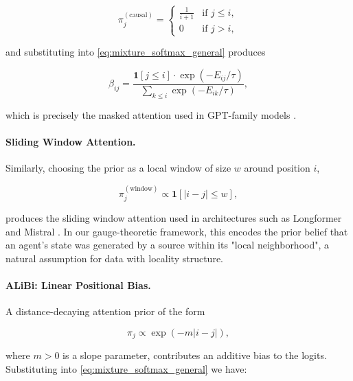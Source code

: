 \documentclass[twoside,11pt]{article}
\begin{document}
\begin{equation}
\pi_j^{(\text{causal})} = \begin{cases} \frac{1}{i+1} & \text{if } j \leq i, \\ 0 & \text{if } j > i, \end{cases}
\label{eq:causal_prior}
\end{equation}

and substituting into \eqref{eq:mixture_softmax_general} produces

\begin{equation}
\beta_{ij} = \frac{\mathbf{1}[j \leq i] \cdot \exp(-E_{ij}/\tau)}{\sum_{k \leq i} \exp(-E_{ik}/\tau)},
\label{eq:causal_attention}
\end{equation}

which is precisely the masked attention used in GPT-family models \citep{radford2019language}. 

\paragraph{Sliding Window Attention.}
Similarly, choosing the prior as a local window of size $w$ around position $i$,

\begin{equation}
\pi_j^{(\text{window})} \propto \mathbf{1}[|i - j| \leq w],
\label{eq:window_prior}
\end{equation}

produces the sliding window attention used in architectures such as Longformer \citep{beltagy2020longformer} and Mistral \citep{jiang2023mistral}. In our gauge-theoretic framework, this encodes the prior belief that an agent's state was generated by a source within its "local neighborhood", a natural assumption for data with locality structure.

\paragraph{ALiBi: Linear Positional Bias.}

A distance-decaying attention prior of the form

\begin{equation}
\pi_j \propto \exp(-m|i - j|),
\label{eq:alibi_prior}
\end{equation}

where $m > 0$ is a slope parameter, contributes an additive bias to the logits. Substituting into \eqref{eq:mixture_softmax_general} we have:
\end{document}

